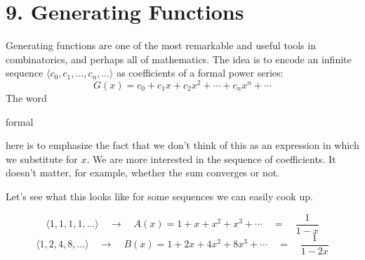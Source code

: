 \documentclass[11pt]{article}
\theoremstyle{plain}
\theoremstyle{definition}
\begin{document}
\section*{9. Generating Functions}
Generating functions are one of the most remarkable and useful tools in combinatorics, and perhaps all of mathematics. 
The idea is to encode an infinite sequence $\langle c_0, c_1, \dots, c_n, \dots \rangle$ as coefficients of a formal power series:
$$
  G(x) = c_0 + c_1x + c_2x^2 + \cdots + c_nx^n + \cdots
$$
The word \begin{em}formal\end{em} here is to emphasize the fact that we don't think of this as an expression in which we substitute for $x$. 
We are more interested in the sequence of coefficients. It doesn't matter, for example, whether the sum converges or not.

Let's see what this looks like for some sequences we can easily cook up.

$$
  \langle 1, 1, 1, 1, \dots \rangle \quad \rightarrow \quad A(x) = 1 + x + x^2 + x^3 + \cdots \quad = \quad \frac{1}{1-x}  
$$
$$
  \langle 1, 2, 4, 8, \dots \rangle \quad \rightarrow \quad B(x) = 1 + 2x + 4x^2 + 8x^3 + \cdots \quad = \quad \frac{1}{1-2x}
$$
\end{document}
